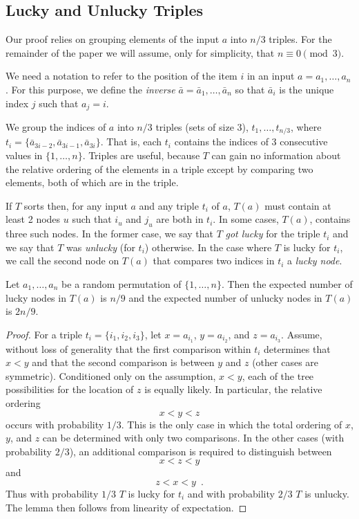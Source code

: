 \documentclass{patmorin}
\begin{document}
\subsection{Lucky and Unlucky Triples}

Our proof relies on grouping elements of the input $a$ into $n/3$ triples.
For the remainder of the paper we will assume, only for simplicity,
that $n\equiv 0\pmod{3}$. 

We need a notation to refer to the position of the item $i$ in an input
$a=a_1,\ldots,a_n$.  For this purpose, we define the \emph{inverse}
$\bar{a}=\bar{a}_1,\ldots,\bar{a}_n$ so that $\bar{a}_i$ is the unique
index $j$ such that $a_j=i$.

We group the indices of $a$ into $n/3$ triples
(sets of size 3), $t_1,\ldots,t_{n/3}$, where
$t_i=\{\bar{a}_{3i-2},\bar{a}_{3i-1},\bar{a}_{3i}\}$.  That is, each
$t_i$ contains the indices of 3 consecutive values in $\{1,\ldots,n\}$.
Triples are useful, because $T$ can gain no information about the relative
ordering of the elements in a triple except by comparing two elements,
both of which are in the triple.

If $T$ sorts then, for any input $a$ and any triple $t_i$ of $a$,
$T(a)$ must contain at least 2 nodes $u$ such that $i_u$ and $j_u$
are both in $t_i$.  In some cases, $T(a)$, contains three such nodes.
In the former case, we say that $T$ \emph{got lucky} for the triple $t_i$
and we say that $T$ was \emph{unlucky} (for $t_i$) otherwise.  In the
case where $T$ is lucky for $t_i$, we call the second node on $T(a)$
that compares two indices in $t_i$ a \emph{lucky node}.

\begin{lem}
  Let $a_1,\ldots,a_n$ be a random permutation of $\{1,\ldots,n\}$.
  Then the expected number of lucky nodes in $T(a)$ is $n/9$ and the
  expected number of unlucky nodes in $T(a)$ is $2n/9$.
\end{lem}

\begin{proof}
  For a triple $t_i=\{i_1,i_2,i_3\}$, let $x=a_{i_1}$, $y=a_{i_2}$,
  and $z=a_{i_3}$.  Assume, without loss of generality that the
  first comparison within $t_i$ determines that $x<y$ and that
  the second comparison is between $y$ and $z$ (other cases are
  symmetric).  Conditioned only on the assumption, $x<y$, each of
  the tree possibilities for the location of $z$ is equally likely.
  In particular, the relative ordering
  \[
     x < y < z
  \]
  occurs with probability $1/3$.  This is the only case in which the
  total ordering of $x$, $y$, and $z$ can be determined with only
  two comparisons.  In the other cases (with probability $2/3$), an
  additional comparison is required to distinguish between
  \[
     x < z < y
  \]
  and 
  \[
     z < x < y \enspace .
  \]
  Thus with probability $1/3$ $T$ is lucky for $t_i$ and with probability
  $2/3$ $T$ is unlucky.  The lemma then follows from linearity of
  expectation.
\end{proof}
\end{document}
